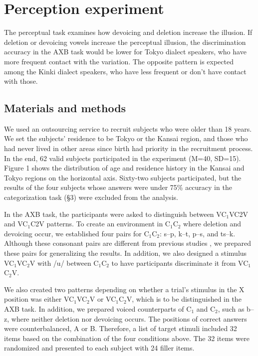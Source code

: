 \documentclass[a4paper,11pt,twocolumn]{article}
\begin{document}
\section{Perception experiment}

The perceptual task examines how devoicing and deletion increase the illusion. If deletion or devoicing vowels increase the perceptual illusion, the discrimination accuracy in the AXB task would be lower for Tokyo dialect speakers, who have more frequent contact with the variation. The opposite pattern is expected among the Kinki dialect speakers, who have less frequent or don't have contact with those.

\subsection{Materials and methods}

We used an outsourcing service to recruit subjects who were older than 18 years. We set the subjects' residence to be Tokyo or the Kansai region, and those who had never lived in other areas since birth had priority in the recruitment process. In the end, 62 valid subjects participated in the experiment (M=40, SD=15). Figure 1 shows the distribution of age and residence history in the Kansai and Tokyo regions on the horizontal axis. Sixty-two subjects participated, but the results of the four subjects whose answers were under 75\% accuracy in the categorization task (\S3) were excluded from the analysis.

In the AXB task, the participants were asked to distinguish between VC$_\text{1}$VC2V and VC$_\text{1}$C2V patterns. To create an environment in C$_\text{1}$C$_\text{2}$ where deletion and devoicing occur, we established four pairs for C$_\text{1}$C$_\text{2}$: s--p, k--t, p--s, and ts--k. Although these consonant pairs are different from previous studies \cite{kilpatrick2018japanese}, we prepared these pairs for generalizing the results. In addition, we also designed a stimulus VC$_\text{1}$VC$_\text{2}$V with /u/ between C$_\text{1}$C$_\text{2}$ to have participants discriminate it from VC$_\text{1}$C$_\text{2}$V.

We also created two patterns depending on whether a trial's stimulus in the X position was either VC$_\text{1}$VC$_\text{2}$V or VC$_\text{1}$C$_\text{2}$V, which is to be distinguished in the AXB task. In addition, we prepared voiced counterparts of C$_\text{1}$ and C$_\text{2}$, such as b--z, where neither deletion nor devoicing occurs. The positions of correct answers were counterbalanced, A or B. Therefore, a list of target stimuli included 32 items based on the combination of the four conditions above. The 32 items were randomized and presented to each subject with 24 filler items.
\end{document}
